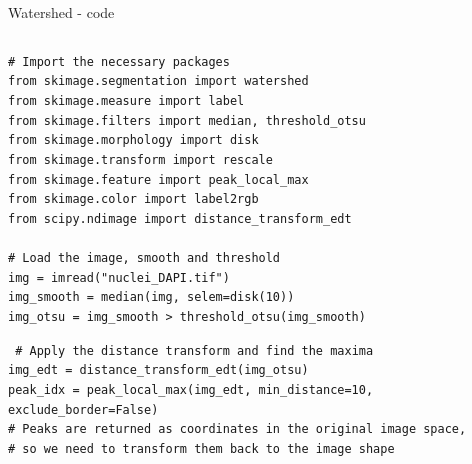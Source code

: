 \documentclass[9pt, aspectratio=169]{beamer}
\begin{document}
\begin{frame}
    {Watershed - code}
    \begin{columns}
        \begin{column}{.7\textwidth}
            {
                \begin{codebox}
                    \texttt{\# Import the necessary packages\\
                        from skimage.segmentation import watershed\\
                        from skimage.measure import label\\
                        from skimage.filters import median, threshold\_otsu\\
                        from skimage.morphology import disk\\
                        from skimage.transform import rescale\\
                        from skimage.feature import peak\_local\_max\\
                        from skimage.color import label2rgb\\
                        from scipy.ndimage import distance\_transform\_edt\\
                        \\
                        \pause
                        \# Load the image, smooth and threshold\\
                        img = imread("nuclei\_DAPI.tif")\\
                        img\_smooth = median(img, selem=disk(10))\\
                        img\_otsu = img\_smooth > threshold\_otsu(img\_smooth)
                    }
                \end{codebox}
            }
            {
                \begin{codebox}
                    \texttt{
                        \# Apply the distance transform and find the maxima\\
                        img\_edt = distance\_transform\_edt(img\_otsu)\\
                        peak\_idx = peak\_local\_max(img\_edt, min\_distance=10, exclude\_border=False)\\
                        \# Peaks are returned as coordinates in the original image space,\\
                        \#  so we need to transform them back to the image shape\\
}
\end{codebox}}
\end{column}
\end{columns}
\end{frame}
\end{document}
